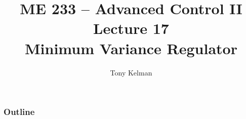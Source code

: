 \documentclass[mathserif]{beamer}              %
\title{ME 233 -- Advanced Control II\\
    Lecture 17 \\
    Minimum Variance Regulator}
\author{Tony Kelman}
\institute{UC Berkeley}
\begin{document}
\maketitle

\begin{frame}
    \frametitle{Outline}
    \tableofcontents
\end{frame}







\end{document}
